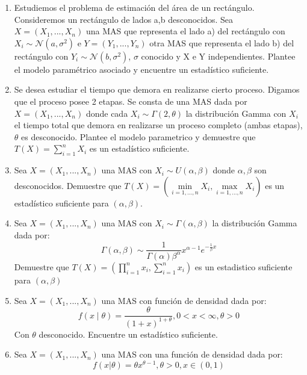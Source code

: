 \begin{enumerate}
    \item Estudiemos el problema de estimación del área de un rectángulo. Consideremos un rectángulo de lados a,b desconocidos. Sea $X=(X_1,...,X_n)$ una MAS que representa el lado a) del rectángulo con $X_i\sim \mathcal{N}(a,\sigma^2)$ e $Y=(Y_1,...,Y_n)$ otra MAS que representa el lado b) del rectángulo con $Y_i\sim \mathcal{N}(b,\sigma^2)$, $\sigma$ conocido y X e Y independientes. Plantee el modelo paramétrico asociado y encuentre un estadístico suficiente. 
    \item Se desea estudiar el tiempo que demora en realizarse cierto proceso. Digamos que el proceso posee 2 etapas. Se consta de una MAS dada por $X=(X_1,...,X_n)$ donde cada $X_i\sim \Gamma(2,\theta)$ la distribución Gamma con $X_i$ el tiempo total que demora en realizarse un proceso completo (ambas etapas), $\theta$ es desconocido. Plantee el modelo parametrico y demuestre que $T(X)=\sum\limits_{i=1}^{n}X_i$ es un estadístico suficiente.
    
    \item Sea $X=(X_1,...,X_n)$ una MAS con $X_i\sim U(\alpha,\beta)$ donde $\alpha,\beta$ son desconocidos. Demuestre que $T(X)=\left(\min\limits_{i=1,...,n}{X_i},\max\limits_{i=1,...,n}{X_i}\right)$ es un estadístico suficiente para $(\alpha,\beta)$.
    
    \item Sea $X=(X_1,...,X_n)$ una MAS con $X_i\sim \Gamma(\alpha,\beta)$ la distribución Gamma dada por:
    \begin{equation}
        \nonumber 
        \Gamma(\alpha,\beta)\sim \frac{1}{\Gamma(\alpha)\beta^\alpha}x^{\alpha-1}e^{-\frac{1}{\beta}x}
    \end{equation}
    Demuestre que $T(X)=\left (\prod\limits_{i=1}^{n}x_i,\sum\limits_{i=1}^{n}x_i  \right )$ es un estadistico suficiente para $(\alpha,\beta)$
    
    \item Sea $X=(X_1,...,X_n)$ una MAS con función de densidad dada por:
    \begin{equation}
        \nonumber 
        f(x\mid \theta)=\frac{\theta}{(1+x)^{1+\theta}} , 0<x<\infty,\theta>0
    \end{equation}
    Con $\theta$ desconocido. Encuentre un estadístico suficiente.
    
    \item Sea $X=(X_1,...,X_n)$ una MAS con una función de densidad dada por:
    \begin{equation}
        \nonumber 
        f(x|\theta)=\theta x^{\theta -1},\theta>0,x\in (0,1)
    \end{equation}
    

\end{enumerate}
